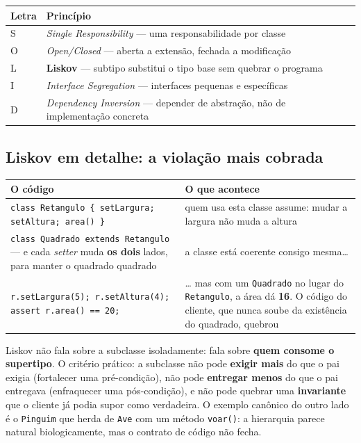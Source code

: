 \begin{conceito}
\begin{center}
\begin{tabular}{@{}p{1.2cm}p{9.6cm}@{}}
\toprule
\textbf{Letra} & \textbf{Princípio} \\
\midrule
S & \textit{Single Responsibility} --- uma responsabilidade por classe \\
O & \textit{Open/Closed} --- aberta a extensão, fechada a modificação \\
L & \textbf{Liskov} --- subtipo substitui o tipo base sem quebrar o
programa \\
I & \textit{Interface Segregation} --- interfaces pequenas e específicas \\
D & \textit{Dependency Inversion} --- depender de abstração, não de
implementação concreta \\
\bottomrule
\end{tabular}
\end{center}
\end{conceito}

\subsection{Liskov em detalhe: a violação mais cobrada}
\label{sec:liskov-teoria}

\begin{exemplo}
\begin{center}
\begin{tabular}{@{}p{5.5cm}p{6.1cm}@{}}
\toprule
\textbf{O código} & \textbf{O que acontece} \\
\midrule
\texttt{class Retangulo \{ setLargura; setAltura; area() \}} & quem usa
esta classe assume: mudar a largura não muda a altura \\
\texttt{class Quadrado extends Retangulo} --- e cada \textit{setter} muda
\textbf{os dois} lados, para manter o quadrado quadrado & a classe está
coerente consigo mesma\ldots \\
\texttt{r.setLargura(5); r.setAltura(4);} \newline
\texttt{assert r.area() == 20;} & \ldots{} mas com um \texttt{Quadrado} no
lugar do \texttt{Retangulo}, a área dá \textbf{16}. O código do cliente,
que nunca soube da existência do quadrado, quebrou \\
\bottomrule
\end{tabular}
\end{center}

Liskov não fala sobre a subclasse isoladamente: fala sobre \textbf{quem
consome o supertipo}. O critério prático: a subclasse não pode
\textbf{exigir mais} do que o pai exigia (fortalecer uma pré-condição),
não pode \textbf{entregar menos} do que o pai entregava (enfraquecer uma
pós-condição), e não pode quebrar uma \textbf{invariante} que o cliente já
podia supor como verdadeira. O exemplo canônico do outro lado é o
\texttt{Pinguim} que herda de \texttt{Ave} com um método \texttt{voar()}:
a hierarquia parece natural biologicamente, mas o contrato de código não
fecha.
\end{exemplo}

